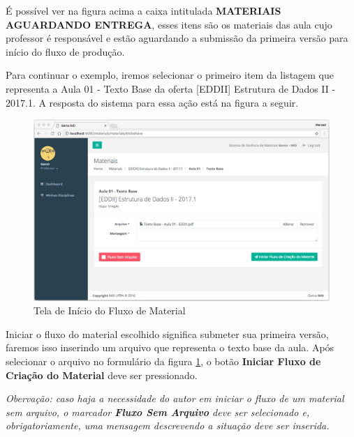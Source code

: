 É possível ver na figura acima a caixa intitulada \textbf{MATERIAIS AGUARDANDO ENTREGA}, esses itens são os materiais das aula cujo professor é responsável e estão aguardando a submissão da primeira versão para início do fluxo de produção.

Para continuar o exemplo, iremos selecionar o primeiro item da listagem que representa a Aula 01 - Texto Base da oferta [EDDII] Estrutura de Dados II - 2017.1. A resposta do sistema para essa ação está na figura a seguir. 

\begin{figure}[H]
\centering
     \includegraphics[width=1.0\textwidth]{Screens/StartMaterialFlow.png}
      \caption{Tela de Início do Fluxo de Material}
       \label{fig:StartMaterialFlow}
\end{figure}

Iniciar o fluxo do material escolhido significa submeter sua primeira versão, faremos isso inserindo um arquivo que representa o texto base da aula. Após selecionar o arquivo no formulário da figura \hyperref[fig:StartMaterialFlow]{\ref{fig:StartMaterialFlow}}, o botão \textbf{Iniciar Fluxo de Criação do Material} deve ser pressionado.

\textit{Obervação: caso haja a necessidade do autor em iniciar o fluxo de um material sem arquivo, o marcador \textbf{Fluxo Sem Arquivo} deve ser selecionado e, obrigatoriamente, uma mensagem descrevendo a situação deve ser inserida.}

